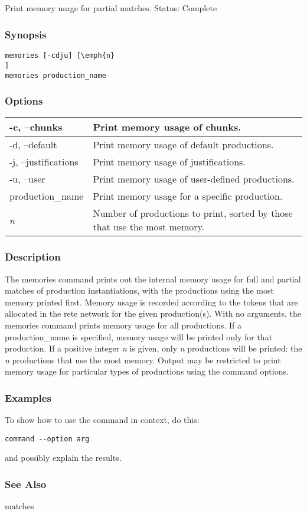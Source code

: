 \subsection{}
\label{memories}
Print memory usage for partial matches. 
 Status: Complete
\subsubsection*{Synopsis}
\begin{verbatim}
memories [-cdju] [\emph{n}
]
memories production_name 
\end{verbatim}
\subsubsection*{Options}
\begin{tabular}{|l|l|}
\hline 
 -c, --chunks  & Print memory usage of chunks.  \\
 \hline 
 -d, --default  & Print memory usage of default productions.  \\
 \hline 
 -j, --justifications  & Print memory usage of justifications.  \\
 \hline 
 -u, --user  & Print memory usage of user-defined productions.  \\
 \hline 
production\_name & Print memory usage for a specific production.  \\
 \hline 
\emph{n}
 & Number of productions to print, sorted by those that use the most memory.  \\
 \hline 
\end{tabular}
\subsubsection*{Description}
 The memories command prints out the internal memory usage for full and partial matches of production instantiations, with the productions using the most memory printed first. 
 Memory usage is recorded according to the tokens that are allocated in the rete network for the given production(s). 
 With no arguments, the memories command prints memory usage for all productions. If a production\_name is specified, memory usage will be printed only for that production. If a positive integer \emph{n}
 is given, only \emph{n}
 productions will be printed: the \emph{n}
 productions that use the most memory. 
 Output may be restricted to print memory usage for particular types of productions using the command options. 
\subsubsection*{Examples}
 To show how to use the command in context, do this: \begin{verbatim}
command --option arg
\end{verbatim}
 and possibly explain the results. 
\subsubsection*{See Also}
 matches
